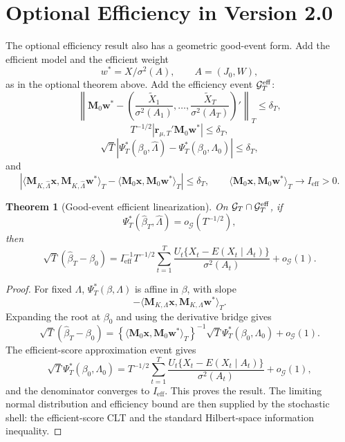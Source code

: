 \documentclass[12pt]{article}
\numberwithin{equation}{section}
\newtheorem{theorem}{Theorem}
\theoremstyle{definition}
\newcommand{\innerT}[2]{\langle #1,#2\rangle_T}
\begin{document}
\section{Optional Efficiency in Version 2.0}

The optional efficiency result also has a geometric good-event form. Add the
efficient model and the efficient weight
\[
    w^*=X/\sigma^2(A),
    \qquad A=(J_0,W),
\]
as in the optional theorem above. Add the efficiency event \(\mathcal G_T^{\rm eff}\):
\[
    \left\|\bm M_0\bm w^*-
    \left(\frac{\widetilde X_1}{\sigma^2(A_1)},\ldots,
          \frac{\widetilde X_T}{\sigma^2(A_T)}\right)'\right\|_T
    \le\delta_T,
\]
\[
    T^{-1/2}|\bm r_{\mu,T}'\bm M_0\bm w^*|\le\delta_T,
\]
\[
    \sqrt T|\Psi_T^*(\beta_0,\widehat\Lambda)
      -\Psi_T^*(\beta_0,\Lambda_0)|\le\delta_T,
\]
and
\[
    \left|\innerT{\bm M_{K,\widehat\Lambda}\bm x}
      {\bm M_{K,\widehat\Lambda}\bm w^*}
      -\innerT{\bm M_0\bm x}{\bm M_0\bm w^*}\right|\le\delta_T,
    \qquad
    \innerT{\bm M_0\bm x}{\bm M_0\bm w^*}\to I_{\mathrm{eff}}>0.
\]

\begin{theorem}[Good-event efficient linearization]
\label{thm:v2-good-event-efficiency}
On \(\mathcal G_T\cap\mathcal G_T^{\rm eff}\), if
\[
    \Psi_T^*(\widehat\beta_T,\widehat\Lambda)=o_{\mathcal G}(T^{-1/2}),
\]
then
\[
    \sqrt T(\widehat\beta_T-\beta_0)
    =I_{\mathrm{eff}}^{-1}
      T^{-1/2}\sum_{t=1}^T
      \frac{U_t\{X_t-E(X_t\mid A_t)\}}{\sigma^2(A_t)}
      +o_{\mathcal G}(1).
\]
\end{theorem}

\begin{proof}
For fixed \(\Lambda\), \(\Psi_T^*(\beta,\Lambda)\) is affine in \(\beta\), with
slope
\[
    -\innerT{\bm M_{K,\Lambda}\bm x}{\bm M_{K,\Lambda}\bm w^*}.
\]
Expanding the root at \(\beta_0\) and using the derivative bridge gives
\[
    \sqrt T(\widehat\beta_T-\beta_0)
    =\left\{\innerT{\bm M_0\bm x}{\bm M_0\bm w^*}\right\}^{-1}
      \sqrt T\Psi_T^*(\beta_0,\Lambda_0)+o_{\mathcal G}(1).
\]
The efficient-score approximation event gives
\[
    \sqrt T\Psi_T^*(\beta_0,\Lambda_0)
    =T^{-1/2}\sum_{t=1}^T
      \frac{U_t\{X_t-E(X_t\mid A_t)\}}{\sigma^2(A_t)}+o_{\mathcal G}(1),
\]
and the denominator converges to \(I_{\mathrm{eff}}\). This proves the result.
The limiting normal distribution and efficiency bound are then supplied by the
stochastic shell: the efficient-score CLT and the standard Hilbert-space
information inequality.
\end{proof}
\end{document}
